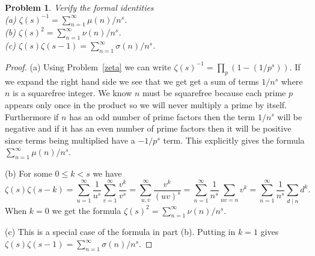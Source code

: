 \documentclass{article}
\newtheorem{problem}{Problem}
\begin{document}
\begin{problem}
Verify the formal identities\\
(a) $\zeta(s)^{-1} = \sum_{n=1}^{\infty} \mu(n)/n^s$.\\
(b) $\zeta(s)^2 = \sum_{n=1}^{\infty} \nu(n)/n^s$.\\
(c) $\zeta(s)\zeta(s-1) = \sum_{n=1}^{\infty} \sigma(n)/n^s$.
\end{problem}
\begin{proof}
(a) Using Problem~\ref{zeta} we can write $\zeta(s)^{-1} = \prod_{p} (1-(1/p^s))$. If we expand the right hand side we see that we get get a sum of terms $1/n^s$ where $n$ is a squarefree integer. We know $n$ must be squarefree because each prime $p$ appears only once in the product so we will never multiply a prime by itself. Furthermore if $n$ has an odd number of prime factors then the term $1/n^s$ will be negative and if it has an even number of prime factors then it will be positive since terms being multiplied have a $-1/p^s$ term. This explicitly gives the formula $\sum_{n=1}^{\infty} \mu(n)/n^s$.

(b) For some $0 \leq k < s$ we have
\[
\zeta(s)\zeta(s-k) = \sum_{u=1}^{\infty} \frac{1}{u^s} \sum_{v=1}^{\infty} \frac{v^k}{v^s} = \sum_{u,v}^{\infty} \frac{v^k}{(uv)^s} = \sum_{n=1}^{\infty} \frac{1}{n^s} \sum_{uv=n} v^k = \sum_{n=1}^{\infty} \frac{1}{n^s} \sum_{d \mid n} d^k.
\]
When $k = 0$ we get the formula $\zeta(s)^2 = \sum_{n=1}^{\infty} \nu(n)/n^s$.

(c) This is a special case of the formula in part (b). Putting in $k = 1$ gives $\zeta(s)\zeta(s-1) = \sum_{n=1}^{\infty} \sigma(n)/n^s$.
\end{proof}
\end{document}
